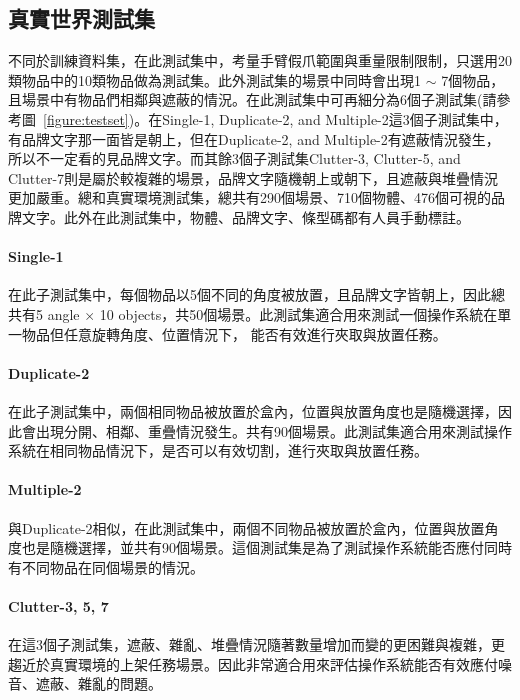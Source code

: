 \subsection{真實世界測試集}
不同於訓練資料集，在此測試集中，考量手臂假爪範圍與重量限制限制，只選用20類物品中的10類物品做為測試集。此外測試集的場景中同時會出現1 $\sim$ 7個物品，且場景中有物品們相鄰與遮蔽的情況。在此測試集中可再細分為6個子測試集(請參考圖~\ref{figure:testset})。在Single-1, Duplicate-2, and Multiple-2這3個子測試集中，有品牌文字那一面皆是朝上，但在Duplicate-2, and Multiple-2有遮蔽情況發生，所以不一定看的見品牌文字。而其餘3個子測試集Clutter-3, Clutter-5, and Clutter-7則是屬於較複雜的場景，品牌文字隨機朝上或朝下，且遮蔽與堆疊情況更加嚴重。總和真實環境測試集，總共有290個場景、710個物體、476個可視的品牌文字。此外在此測試集中，物體、品牌文字、條型碼都有人員手動標註。

\paragraph{Single-1}
在此子測試集中，每個物品以5個不同的角度被放置，且品牌文字皆朝上，因此總共有5 angle $\times$ 10 objects，共50個場景。此測試集適合用來測試一個操作系統在單一物品但任意旋轉角度、位置情況下， 能否有效進行夾取與放置任務。

\paragraph{Duplicate-2}
在此子測試集中，兩個相同物品被放置於盒內，位置與放置角度也是隨機選擇，因此會出現分開、相鄰、重疊情況發生。共有90個場景。此測試集適合用來測試操作系統在相同物品情況下，是否可以有效切割，進行夾取與放置任務。

\paragraph{Multiple-2}
與Duplicate-2相似，在此測試集中，兩個不同物品被放置於盒內，位置與放置角度也是隨機選擇，並共有90個場景。這個測試集是為了測試操作系統能否應付同時有不同物品在同個場景的情況。

\paragraph{Clutter-3, 5, 7}
在這3個子測試集，遮蔽、雜亂、堆疊情況隨著數量增加而變的更困難與複雜，更趨近於真實環境的上架任務場景。因此非常適合用來評估操作系統能否有效應付噪音、遮蔽、雜亂的問題。


